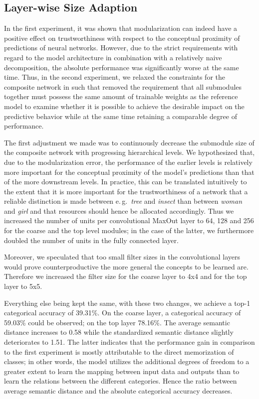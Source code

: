 \documentclass[conference]{IEEEtran}
\begin{document}
\subsection{Layer-wise Size Adaption%
            \label{sec:experiments_2}}

In the first experiment, it was shown that modularization can indeed have a positive effect on trustworthiness with respect to the conceptual proximity of predictions of neural networks. However, due to the strict requirements with regard to the model architecture in combination with a relatively naive decomposition, the absolute performance was significantly worse at the same time. Thus, in the second experiment, we relaxed the constraints for the composite network in such that removed the requirement that all submodules together must possess the same amount of trainable weights as the reference model to examine whether it is possible to achieve the desirable impact on the predictive behavior while at the same time retaining a comparable degree of performance.

The first adjustment we made was to continuously decrease the submodule size of the composite network with progressing hierarchical levels. We hypothesized that, due to the modularization error, the performance of the earlier levels is relatively more important for the conceptual proximity of the model's predictions than that of the more downstream levels. In practice, this can be translated intuitively to the extent that it is more important for the trustworthiness of a network that a reliable distinction is made between e.\,g.\ \textit{tree} and \textit{insect} than between \textit{woman} and \textit{girl} and that resources should hence be allocated accordingly. Thus we increased the number of units per convolutional MaxOut layer to 64, 128 and 256 for the coarse and the top level modules; in the case of the latter, we furthermore doubled the number of units in the fully connected layer.

Moreover, we speculated that too small filter sizes in the convolutional layers would prove counterproductive the more general the concepts to be learned are. Therefore we increased the filter size for the coarse layer to 4x4 and for the top layer to 5x5.

Everything else being kept the same, with these two changes, we achieve a top-1 categorical accuracy of 39.31\%. On the coarse layer, a categorical accuracy of 59.03\% could be observed; on the top layer 78.16\%. The average semantic distance increases to 0.58 while the standardized semantic distance slightly deteriorates to 1.51. The latter indicates that the performance gain in comparison to the first experiment is mostly attributable to the direct memorization of classes; in other words, the model utilizes the additional degrees of freedom to a greater extent to learn the mapping between input data and outputs than to learn the relations between the different categories. Hence the ratio between average semantic distance and the absolute categorical accuracy decreases.
\end{document}
